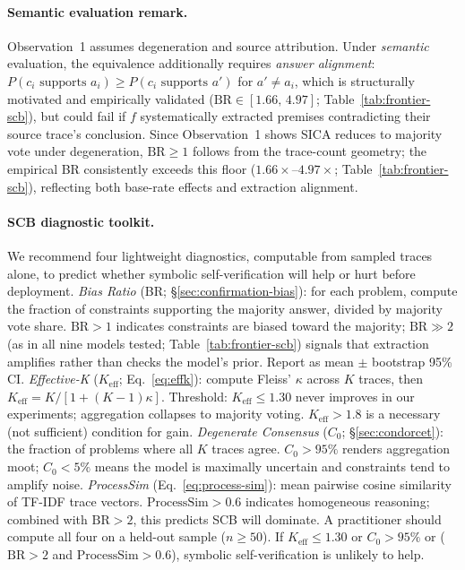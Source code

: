 \paragraph{Semantic evaluation remark.}
\label{app:semantic-remark}
Observation~1 assumes degeneration and source attribution. Under \emph{semantic} evaluation, the equivalence additionally requires \emph{answer alignment}: $P(c_i \text{ supports } a_i) \geq P(c_i \text{ supports } a')$ for $a' \neq a_i$, which is structurally motivated and empirically validated ($\mathrm{BR} \in [1.66,\, 4.97]$; Table~\ref{tab:frontier-scb}), but could fail if $f$ systematically extracted premises contradicting their source trace's conclusion.
Since Observation~1 shows SICA reduces to majority vote under degeneration, $\mathrm{BR} \geq 1$ follows from the trace-count geometry; the empirical BR consistently exceeds this floor ($1.66\times$--$4.97\times$; Table~\ref{tab:frontier-scb}), reflecting both base-rate effects and extraction alignment.

\paragraph{SCB diagnostic toolkit.}
\label{app:diagnostic-toolkit}
We recommend four lightweight diagnostics, computable from sampled traces alone, to predict whether symbolic self-verification will help or hurt before deployment.
\emph{Bias Ratio} (BR; \S\ref{sec:confirmation-bias}): for each problem, compute the fraction of constraints supporting the majority answer, divided by majority vote share. $\text{BR} > 1$ indicates constraints are biased toward the majority; $\text{BR} \gg 2$ (as in all nine models tested; Table~\ref{tab:frontier-scb}) signals that extraction amplifies rather than checks the model's prior. Report as mean $\pm$ bootstrap 95\% CI.
\emph{Effective-K} ($K_\text{eff}$; Eq.~\ref{eq:effk}): compute Fleiss' $\kappa$ across $K$ traces, then $K_\text{eff} = K / [1 + (K-1)\kappa]$. Threshold: $K_\text{eff} \leq 1.30$ never improves in our experiments; aggregation collapses to majority voting. $K_\text{eff} > 1.8$ is a necessary (not sufficient) condition for gain.
\emph{Degenerate Consensus} ($C_0$; \S\ref{sec:condorcet}): the fraction of problems where all $K$ traces agree. $C_0 > 95\%$ renders aggregation moot; $C_0 < 5\%$ means the model is maximally uncertain and constraints tend to amplify noise.
\emph{ProcessSim} (Eq.~\ref{eq:process-sim}): mean pairwise cosine similarity of TF-IDF trace vectors. $\text{ProcessSim} > 0.6$ indicates homogeneous reasoning; combined with $\text{BR} > 2$, this predicts SCB will dominate.
A practitioner should compute all four on a held-out sample ($n \geq 50$). If $K_\text{eff} \leq 1.30$ or $C_0 > 95\%$ or ($\text{BR} > 2$ and $\text{ProcessSim} > 0.6$), symbolic self-verification is unlikely to help.

